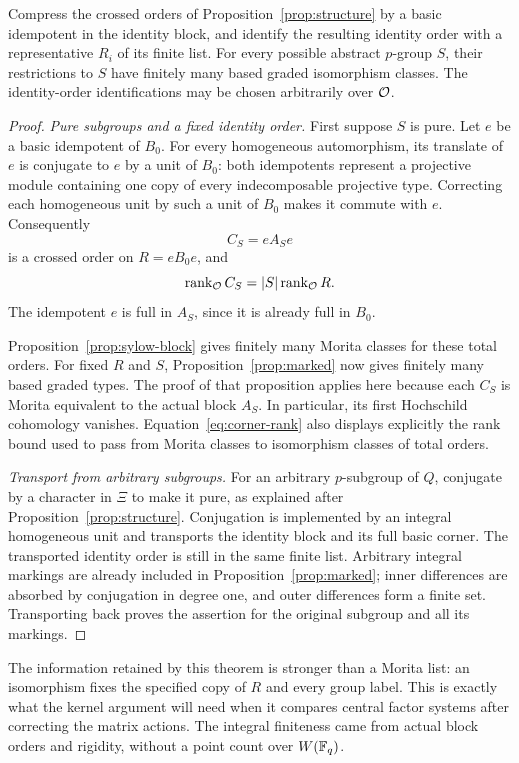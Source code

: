 \begin{theorem}
\label{thm:based-sylow}
Compress the crossed orders of Proposition~\ref{prop:structure}
by a basic idempotent in the identity block, and identify the
resulting identity order with a representative $R_i$ of its
finite list.  For every possible abstract $p$-group $S$, their
restrictions to $S$ have finitely many based graded isomorphism
classes.  The identity-order identifications may be chosen
arbitrarily over $\mathcal O$.
\end{theorem}

\begin{proof}
\emph{Pure subgroups and a fixed identity order.}
First suppose $S$ is pure.  Let $e$ be a basic idempotent of
$B_0$.  For every homogeneous automorphism, its translate of
$e$ is conjugate to $e$ by a unit of $B_0$: both idempotents
represent a projective module containing one copy of every
indecomposable projective type.  Correcting each homogeneous
unit by such a unit of $B_0$ makes it commute with $e$.
Consequently
\[
 C_S=eA_Se
\]
is a crossed order on $R=eB_0e$, and
\begin{equation}\label{eq:corner-rank}
 \operatorname{rank}_{\mathcal O}C_S=|S|\operatorname{rank}_{\mathcal O}R.
\end{equation}
The idempotent $e$ is full in $A_S$, since it is already full
in $B_0$.

Proposition~\ref{prop:sylow-block} gives finitely many Morita
classes for these total orders.  For fixed $R$ and $S$,
Proposition~\ref{prop:marked} now gives finitely many based
graded types.  The proof of that proposition applies here
because each $C_S$ is Morita equivalent to the actual block
$A_S$.  In particular, its first Hochschild cohomology
vanishes.  Equation~\eqref{eq:corner-rank} also displays
explicitly the rank bound used to pass from Morita classes to
isomorphism classes of total orders.

\emph{Transport from arbitrary subgroups.}
For an arbitrary $p$-subgroup of $Q$, conjugate by a character
in $\Xi$ to make it pure, as explained after
Proposition~\ref{prop:structure}.  Conjugation is implemented
by an integral homogeneous unit and transports the identity
block and its full basic corner.  The transported identity
order is still in the same finite list.  Arbitrary integral
markings are already included in
Proposition~\ref{prop:marked}; inner differences are absorbed
by conjugation in degree one, and outer differences form a
finite set.  Transporting back proves the assertion for the
original subgroup and all its markings.
\end{proof}

The information retained by this theorem is stronger than a Morita
list: an isomorphism fixes the specified copy of $R$ and every group
label.  This is exactly what the kernel argument will need when it
compares central factor systems after correcting the matrix actions.
The integral finiteness came from actual block orders and rigidity,
without a point count over $W(\mathbb F_q)$.
